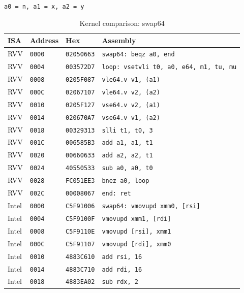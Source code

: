 \begin{table}[htbp]
\centering
\caption{Kernel comparison: swap64}
\begingroup
\scriptsize
\setlength{\tabcolsep}{4pt}
\noindent \texttt{a0 = n, a1 = x, a2 = y}\par
\vspace{0.6ex}
\begin{tabular}{@{}l|l|l|p{7.2cm}@{}}
\toprule
ISA & Address & Hex & Assembly \\
\midrule
RVV & \texttt{0000} & \texttt{02050663} & \texttt{swap64: beqz a0, end} \\
RVV & \texttt{0004} & \texttt{003572D7} & \texttt{loop: vsetvli t0, a0, e64, m1, tu, mu} \\
RVV & \texttt{0008} & \texttt{0205F087} & \texttt{vle64.v v1, (a1)} \\
RVV & \texttt{000C} & \texttt{02067107} & \texttt{vle64.v v2, (a2)} \\
RVV & \texttt{0010} & \texttt{0205F127} & \texttt{vse64.v v2, (a1)} \\
RVV & \texttt{0014} & \texttt{020670A7} & \texttt{vse64.v v1, (a2)} \\
RVV & \texttt{0018} & \texttt{00329313} & \texttt{slli t1, t0, 3} \\
RVV & \texttt{001C} & \texttt{006585B3} & \texttt{add a1, a1, t1} \\
RVV & \texttt{0020} & \texttt{00660633} & \texttt{add a2, a2, t1} \\
RVV & \texttt{0024} & \texttt{40550533} & \texttt{sub a0, a0, t0} \\
RVV & \texttt{0028} & \texttt{FC051EE3} & \texttt{bnez a0, loop} \\
RVV & \texttt{002C} & \texttt{00008067} & \texttt{end: ret} \\
\midrule
Intel & \texttt{0000} & \texttt{C5F91006} & \texttt{swap64: vmovupd xmm0, [rsi]} \\
Intel & \texttt{0004} & \texttt{C5F9100F} & \texttt{vmovupd xmm1, [rdi]} \\
Intel & \texttt{0008} & \texttt{C5F9110E} & \texttt{vmovupd [rsi], xmm1} \\
Intel & \texttt{000C} & \texttt{C5F91107} & \texttt{vmovupd [rdi], xmm0} \\
Intel & \texttt{0010} & \texttt{4883C610} & \texttt{add rsi, 16} \\
Intel & \texttt{0014} & \texttt{4883C710} & \texttt{add rdi, 16} \\
Intel & \texttt{0018} & \texttt{4883EA02} & \texttt{sub rdx, 2} \\

\end{tabular}
\end{table}
